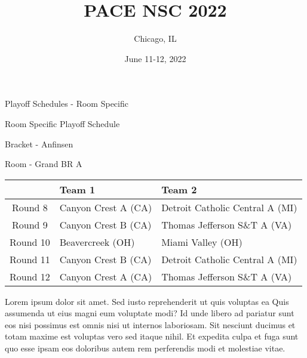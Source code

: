 \documentclass{article}%
\title{PACE NSC 2022}%
\author{Chicago, IL}%
\date{June 11{-}12, 2022}%
\begin{document}
%
\normalsize%
%
\maketitle%
\vspace*{48pt}%
\begin{center}%
\begin{Huge}%
Playoff Schedules {-} Room Specific%
\end{Huge}%
\end{center}%
\newpage%
\begin{center}%
\begin{Huge}%
Room Specific Playoff Schedule%
\end{Huge}%
\vspace*{8pt}%
\linebreak%
\begin{Large}%
Bracket {-} Anfinsen%
\end{Large}%
\vspace*{8pt}%
\linebreak%
\vspace*{8pt}%
\begin{Large}%
Room {-} Grand BR A%
\end{Large}%
\end{center}%
%
\begin{tabularx}{\textwidth}{|c|Y|Y|}%
\hline%
&Team 1&Team 2\\%
\hline%
Round 8&Canyon Crest A (CA)&Detroit Catholic Central A (MI)\\%
Round 9&Canyon Crest B (CA)&Thomas Jefferson S\&T A (VA)\\%
Round 10&Beavercreek (OH)&Miami Valley (OH)\\%
Round 11&Canyon Crest B (CA)&Detroit Catholic Central A (MI)\\%
Round 12&Canyon Crest A (CA)&Thomas Jefferson S\&T A (VA)\\%
\hline%
\end{tabularx}%
\vspace*{8pt}%
\newline%
Lorem ipsum dolor sit amet. Sed iusto reprehenderit ut quis voluptas ea Quis assumenda ut eius magni eum voluptate modi? Id unde libero ad pariatur sunt eos nisi possimus est omnis nisi ut internos laboriosam. Sit nesciunt ducimus et totam maxime est voluptas vero sed itaque nihil. Et expedita culpa et fuga sunt quo esse ipsam eos doloribus autem rem perferendis modi et molestiae vitae.\newline%
\end{document}
